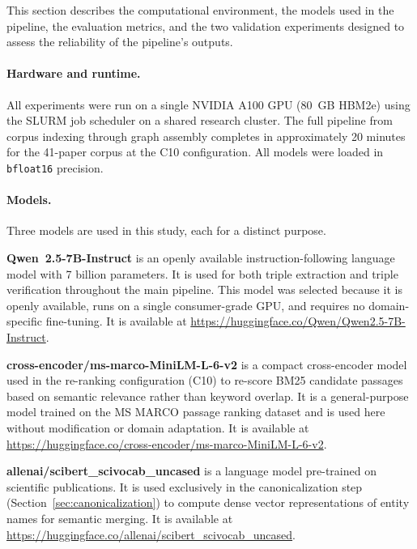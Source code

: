 \documentclass[10pt]{article}
\begin{document}
This section describes the computational environment, the models
used in the pipeline, the evaluation metrics, and the two
validation experiments designed to assess the reliability of the
pipeline's outputs.

\paragraph{Hardware and runtime.}

All experiments were run on a single NVIDIA A100 GPU (80~GB
HBM2e) using the SLURM job scheduler on a shared research
cluster.
The full pipeline from corpus indexing through graph assembly
completes in approximately 20 minutes for the 41-paper corpus
at the C10 configuration.
All models were loaded in \texttt{bfloat16} precision.

\paragraph{Models.}

Three models are used in this study, each for a distinct
purpose.

\textbf{Qwen~2.5-7B-Instruct} \citep{yang2024qwen2technicalreport}
is an openly available instruction-following language model with
7 billion parameters.
It is used for both triple extraction and triple verification
throughout the main pipeline.
This model was selected because it is openly available, runs
on a single consumer-grade GPU, and requires no domain-specific
fine-tuning.
It is available at
\url{https://huggingface.co/Qwen/Qwen2.5-7B-Instruct}.

\textbf{cross-encoder/ms-marco-MiniLM-L-6-v2}
\citep{bajaj2016ms} is a compact cross-encoder model used in
the re-ranking configuration (C10) to re-score BM25 candidate
passages based on semantic relevance rather than keyword
overlap.
It is a general-purpose model trained on the MS MARCO passage
ranking dataset and is used here without modification or
domain adaptation.
It is available at
\url{https://huggingface.co/cross-encoder/ms-marco-MiniLM-L-6-v2}.

\textbf{allenai/scibert\_scivocab\_uncased}
\citep{beltagy2019scibertpretrainedlanguagemodel} is a
language model pre-trained on scientific publications.
It is used exclusively in the canonicalization step
(Section~\ref{sec:canonicalization}) to compute dense
vector representations of entity names for semantic merging.
It is available at
\url{https://huggingface.co/allenai/scibert_scivocab_uncased}.
\end{document}

